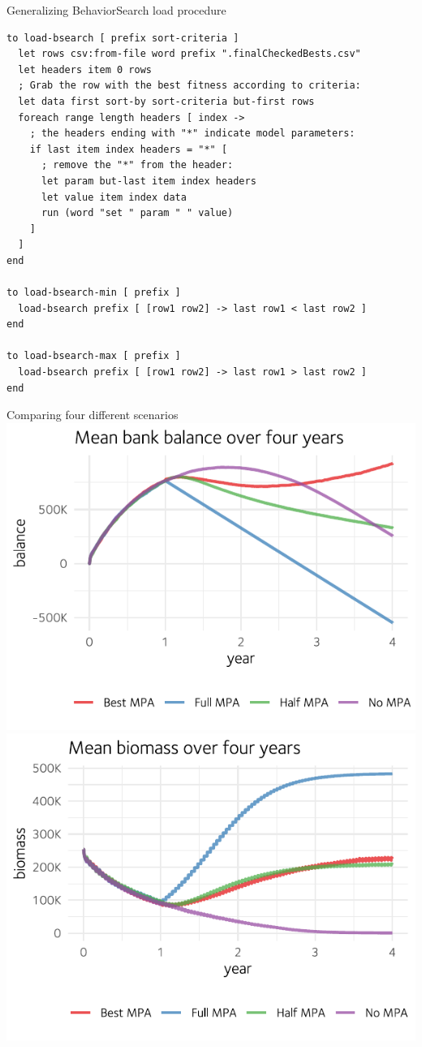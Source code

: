 \documentclass[table, 14pt, aspectratio=169]{beamer}
\begin{document}
\begin{frame}[fragile=singleslide]{Generalizing BehaviorSearch load procedure}
    \begin{verbatim}  
to load-bsearch [ prefix sort-criteria ]
  let rows csv:from-file word prefix ".finalCheckedBests.csv"
  let headers item 0 rows
  ; Grab the row with the best fitness according to criteria:
  let data first sort-by sort-criteria but-first rows
  foreach range length headers [ index ->
    ; the headers ending with "*" indicate model parameters:
    if last item index headers = "*" [
      ; remove the "*" from the header:
      let param but-last item index headers
      let value item index data
      run (word "set " param " " value)
    ]
  ]
end

to load-bsearch-min [ prefix ]
  load-bsearch prefix [ [row1 row2] -> last row1 < last row2 ]
end

to load-bsearch-max [ prefix ]
  load-bsearch prefix [ [row1 row2] -> last row1 > last row2 ]
end
    \end{verbatim}
\end{frame}

\begin{frame}{Comparing four different scenarios}
  \includegraphics[width=0.49\linewidth]{images/experiment_balance.pdf}
  \hfill
  \includegraphics[width=0.49\linewidth]{images/experiment_biomass.pdf}
\end{frame}
\end{document}
